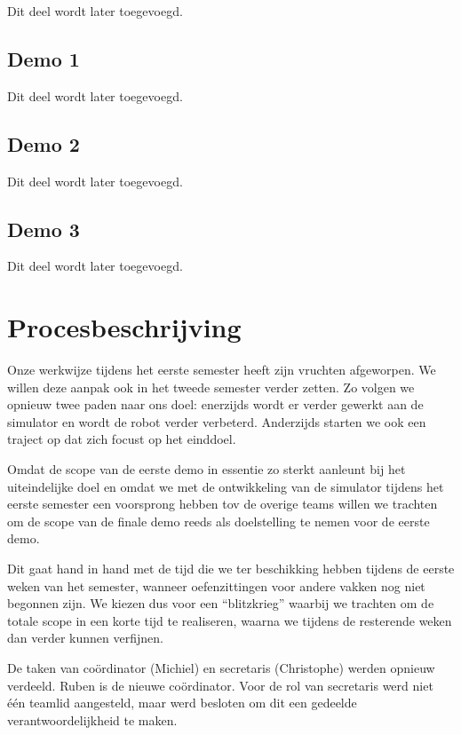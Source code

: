 \documentclass[12pt,a4paper]{report}
\begin{document}
Dit deel wordt later toegevoegd.

\section{Demo 1}

Dit deel wordt later toegevoegd.

\section{Demo 2}

Dit deel wordt later toegevoegd.

\section{Demo 3}

Dit deel wordt later toegevoegd.

\chapter{Procesbeschrijving}

Onze werkwijze tijdens het eerste semester heeft zijn vruchten afgeworpen. We willen deze aanpak ook in het tweede semester verder zetten. Zo volgen we opnieuw twee paden naar ons doel: enerzijds wordt er verder gewerkt aan de simulator en wordt de robot verder verbeterd. Anderzijds starten we ook een traject op dat zich focust op het einddoel.

Omdat de scope van de eerste demo in essentie zo sterkt aanleunt bij het uiteindelijke doel en omdat we met de ontwikkeling van de simulator tijdens het eerste semester een voorsprong hebben tov de overige teams willen we trachten om de scope van de finale demo reeds als doelstelling te nemen voor de eerste demo.

Dit gaat hand in hand met de tijd die we ter beschikking hebben tijdens de eerste weken van het semester, wanneer oefenzittingen voor andere vakken nog niet begonnen zijn. We kiezen dus voor een ``blitzkrieg'' waarbij we trachten om de totale scope in een  korte tijd te realiseren, waarna we tijdens de resterende weken dan verder kunnen verfijnen.

De taken van co\"ordinator (Michiel) en secretaris (Christophe) werden opnieuw verdeeld. Ruben is de nieuwe co\"ordinator. Voor de rol van secretaris werd niet \'e\'en teamlid aangesteld, maar werd besloten om dit een gedeelde verantwoordelijkheid te maken.
\end{document}

